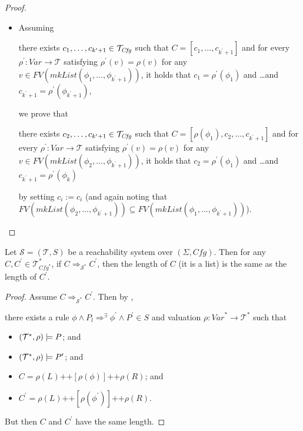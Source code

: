 \begin{proof}
\begin{itemize}
\begin{itemize}
        \item Assuming
        \begin{proofenv}
        there exists $c_1, \ldots, c_{k^\prime + 1} \in \mathcal{T}_{\mathit{Cfg}}$ such that $C = [c_1, \ldots, c_{k^\prime + 1}]$
        and for every $\rho^\prime : \mathit{Var} \to \mathcal{T}$ satisfying
        $\rho^\prime(v) = \rho(v)$ for any
        $v \in \mathit{FV}(\mathit{mkList}(\phi_1, \ldots, \phi_{k^\prime + 1}))$,
        it holds that
        $c_1 = \rho^\prime(\phi_1)$ and \ldots and $c_{k^\prime + 1} = \rho^\prime(\phi_{k^\prime + 1})$,
        \end{proofenv}
        we prove that
        \begin{proofenv}
        there exists $c_2, \ldots, c_{k^\prime + 1} \in \mathcal{T}_{\mathit{Cfg}}$ such that
        $C = [\rho(\phi_1), c_2, \ldots, c_{k^\prime+1}]$
        and for every $\rho^\prime : \mathit{Var} \to \mathcal{T}$ satisfying
        $\rho^\prime(v) = \rho(v)$ for any
        $v \in \mathit{FV}(\mathit{mkList}(\phi_2, \ldots, \phi_{k^\prime+1}))$,
        it holds that
        $c_2 = \rho^\prime(\phi_1)$ and \ldots and $c_{k^\prime+1} = \rho^\prime(\phi_k)$
        \end{proofenv}
        by setting $c_i := c_i$
        (and again noting that $\mathit{FV}(\mathit{mkList}(\phi_2,\ldots,\phi_{k^\prime+1})) \subseteq \mathit{FV}(\mathit{mkList}(\phi_1,\ldots,\phi_{k^\prime+1}))$).
    \end{itemize}
\end{itemize}
\end{proof}

\begin{lemma}\label{lem:transitionOnlyBetweenListsOfSameLength}
    Let $\mathcal{S} = (\mathcal{T}, S)$ be a reachability system over $(\Sigma, \mathit{Cfg})$.
    Then for any $C,C^\prime \in \mathcal{T}^*_{\mathit{Cfg}^*}$,
    if $C \Rightarrow_{\mathcal{S}^*} C^\prime$,
    then the length of $C$ (it is a list) is the same as the length of $C^\prime$.
\end{lemma}
\begin{proof}
Assume $C \Rightarrow_{\mathcal{S}^*} C^\prime$.
Then by ,
\begin{proofenv}
    there exists a rule $\phi \land P_l \Rightarrow^\exists \phi^\prime \land P^\prime \in S$
    and valuation $\rho : \mathit{Var}^* \to \mathcal{T}^*$ such that
    \begin{itemize}
        \item $(\mathcal{T}^*, \rho) \models P$; and
        \item $(\mathcal{T}^*, \rho) \models P^\prime$; and
        \item $C = \rho(L) \texttt{++} [\rho(\phi)] \texttt{++} \rho(R)$; and
        \item $C^\prime = \rho(L) \texttt{++} [\rho(\phi^\prime)] 
        \texttt{++} \rho(R)$.
    \end{itemize}
\end{proofenv}
But then $C$ and $C^\prime$ have the same length.
\end{proof}

